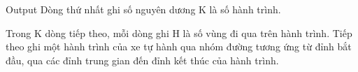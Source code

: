 Output
Dòng thứ nhất ghi số nguyên dương K là số hành trình.  

   Trong K dòng tiếp theo, mỗi dòng ghi H là số vùng đi qua trên hành trình. Tiếp theo ghi một hành trình của xe tự hành qua nhóm đường tương ứng từ đỉnh bắt đầu, qua các đỉnh trung gian đến đỉnh kết thúc của hành trình.